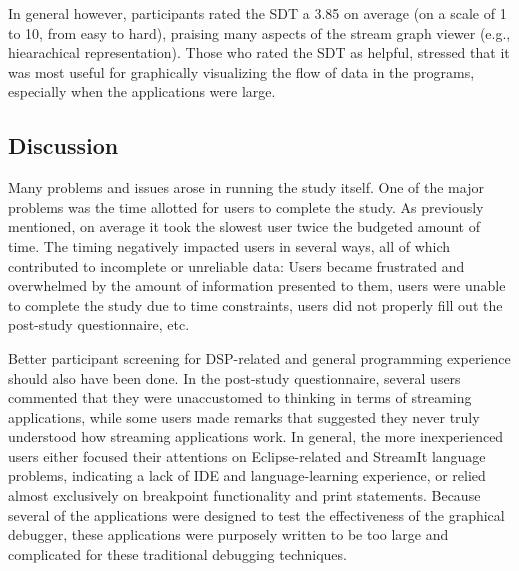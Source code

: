 \documentclass[11pt, letterpaper, onecolumn]{article}
\begin{document}
In general however, participants rated the SDT a 3.85 on average (on a
scale of  1 to 10,  from easy to  hard), praising many aspects  of the
stream  graph viewer (e.g.,  hiearachical representation).   Those who
rated  the  SDT as  helpful,  stressed that  it  was  most useful  for
graphically visualizing  the flow of data in  the programs, especially
when the applications were large.


\subsection{Discussion}

Many problems and issues arose in running the study itself. One of the
major  problems  was the  time  allotted  for  users to  complete  the
study. As  previously mentioned, on  average it took the  slowest user
twice  the budgeted  amount of  time.  The timing   negatively
impacted users in several ways, all of which contributed to incomplete
or  unreliable data: Users  became frustrated  and overwhelmed  by the
amount of information presented to them, users were unable to complete
the study due to time constraints, users did not properly fill out the
post-study questionnaire, etc.

Better participant  screening for DSP-related  and general programming
experience   should   also  have   been   done.   In  the   post-study
questionnaire, several users commented  that they were unaccustomed to
thinking  in terms of  streaming applications,  while some  users made
remarks  that  suggested they  never  truly  understood how  streaming
applications  work. In  general, the  more inexperienced  users either
focused  their  attentions on  Eclipse-related  and StreamIt  language
problems, indicating  a lack of IDE  and language-learning experience,
or  relied almost  exclusively on  breakpoint functionality  and print
statements. Because several of  the applications were designed to test
the effectiveness  of the graphical debugger, these  applications were
purposely  written   to  be  too  large  and   complicated  for  these
traditional debugging techniques.
\end{document}
